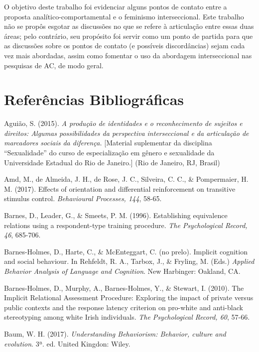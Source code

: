 O objetivo deste trabalho foi evidenciar alguns pontos de contato entre a proposta analítico-comportamental e o feminismo interseccional. Este trabalho não se propôs esgotar as discussões no que se refere à articulação entre essas duas áreas; pelo contrário, seu propósito foi servir como um ponto de partida para que as discussões sobre os pontos de contato (e possíveis discordâncias) sejam cada vez mais abordadas, assim como fomentar o uso da abordagem interseccional nas pesquisas de AC, de modo geral.
\vfill
\pagebreak
\section*{Referências Bibliográficas}

\hangindent=25pt
\noindent Aguião, S. (2015). \textit{A produção de identidades e o reconhecimento de sujeitos e direitos: Algumas possibilidades da perspectiva interseccional e da articulação de marcadores sociais da diferença.} [Material suplementar da disciplina ``Sexualidade'' do curso de especialização em gênero e sexualidade da Universidade Estadual do Rio de Janeiro.] (Rio de Janeiro, RJ, Brasil) 

\hangindent=25pt
\noindent Amd, M., de Almeida, J. H., de Rose, J. C., Silveira, C. C., \& Pompermaier, H. M. (2017). Effects of orientation and differential reinforcement on transitive stimulus control. \textit{Behavioural Processes, 144}, 58-65.

\hangindent=25pt
\noindent Barnes, D., Leader, G., \& Smeets, P. M. (1996). Establishing equivalence relations using a respondent-type training procedure. \textit{The Psychological Record, 46}, 685-706.

\hangindent=25pt
\noindent Barnes-Holmes, D., Harte, C., \& McEnteggart, C. (no prelo). Implicit cognition and social behaviour. In Rehfeldt, R. A., Tarbox, J., \& Fryling, M. (Eds.) \textit{Applied Behavior Analysis of Language and Cognition}. New Harbinger: Oakland, CA.

\hangindent=25pt
\noindent Barnes-Holmes, D., Murphy, A., Barnes-Holmes, Y., \& Stewart, I. (2010). The Implicit Relational Assessment Procedure: Exploring the impact of private versus public contexts and the response latency criterion on pro-white and anti-black stereotyping among white Irish individuals. \textit{The Psychological Record, 60}, 57-66.

\hangindent=25pt
\noindent Baum, W. H. (2017). \textit{Understanding Behaviorism: Behavior, culture and evolution}. 3ª. ed. United Kingdon: Wiley. 

